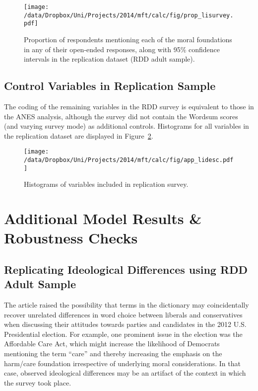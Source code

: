 \begin{figure}[ht]\centering
\texttt{[image: /data/Dropbox/Uni/Projects/2014/mft/calc/fig/prop\_lisurvey.pdf]}
\caption[Proportion of respondents mentioning each of the moral foundations in any of their open-ended responses (RDD adult sample)]{Proportion of respondents mentioning each of the moral foundations in any of their open-ended responses, along with 95\% confidence intervals in the replication dataset (RDD adult sample).}\label{fig:prop_lisurvey}
\end{figure}

\clearpage
\subsection{Control Variables in Replication Sample}

The coding of the remaining variables in the RDD survey is equivalent to those in the ANES analysis, although the survey did not contain the Wordsum scores (and varying survey mode) as additional controls. Histograms for all variables in the replication dataset are displayed in Figure~\ref{fig:app_lidesc}.


\begin{figure}[h]\centering
\texttt{[image: /data/Dropbox/Uni/Projects/2014/mft/calc/fig/app\_lidesc.pdf]}
\caption[Histograms of variables included in replication survey]{Histograms of variables included in replication survey.}\label{fig:app_lidesc}
\end{figure}


\clearpage
\section{Additional Model Results \& Robustness Checks}\label{app:robust}



\subsection{Replicating Ideological Differences using RDD Adult Sample}

The article raised the possibility that terms in the dictionary may coincidentally recover unrelated differences in word choice between liberals and conservatives when discussing their attitudes towards parties and candidates in the 2012 U.S. Presidential election. For example, one prominent issue in the election was the Affordable Care Act, which might increase the likelihood of Democrats mentioning the term ``care'' and thereby increasing the emphasis on the harm/care foundation irrespective of underlying moral considerations. In that case, observed ideological differences may be an artifact of the context in which the survey took place.

